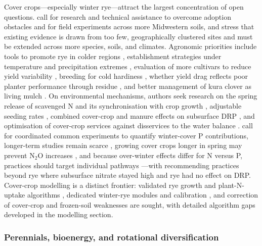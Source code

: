 \documentclass[11pt]{article}
\begin{document}
Cover crops---especially winter rye---attract the largest concentration of open
questions. \textcite{Kladivko2014} call for research and technical assistance to
overcome adoption obstacles and for field experiments across more Midwestern
soils, and \textcite{Birru2023,Zhao2016} stress that existing evidence is drawn
from too few, geographically clustered sites and must be extended across more
species, soils, and climates. Agronomic priorities include tools to promote rye
in colder regions \parencite{Waring2020}, establishment strategies under
temperature and precipitation extremes \parencite{Bawa2023}, evaluation of more
cultivars to reduce yield variability \parencite{Kaspar2007}, breeding for cold
hardiness \parencite{Dinnes2002,Liu2019}, whether yield drag reflects poor
planter performance through residue \parencite{Dougherty2020}, and better
management of kura clover as living mulch \parencite{Qi2011b,Qi2011}. On
environmental mechanisms, authors seek research on the spring release of
scavenged N and its synchronisation with crop growth \parencite{Lacey2015},
adjustable seeding rates \parencite{Roth2018}, combined cover-crop and manure
effects on subsurface DRP \parencite{Askar2023}, and optimisation of cover-crop
services against disservices to the water balance \parencite{Meyer2019}.
\textcite{Liu2019} call for coordinated common experiments to quantify
winter-cover P contributions, longer-term studies remain scarce
\parencite{Kaspar2012,MartinezFeria2016}, growing cover crops longer in spring
may prevent N$_2$O increases \parencite{PrezaFontes2023}, and because over-winter
effects differ for N versus P, practices should target individual pathways
\parencite{McNeill2026}---with \textcite{Krueger2013} recommending practices
beyond rye where subsurface nitrate stayed high and rye had no effect on DRP.
Cover-crop modelling is a distinct frontier: validated rye growth and plant-N-
uptake algorithms \parencite{Feyereisen2006,Malone2007c}, dedicated winter-rye
modules and calibration \parencite{Malone2014b,Chatterjee2025}, and correction
of cover-crop and frozen-soil weaknesses \parencite{Dietzel2016,Gupta2022,Gupta2023b}
are sought, with detailed algorithm gaps developed in the modelling section.

\subsubsection{Perennials, bioenergy, and rotational diversification}
\end{document}
